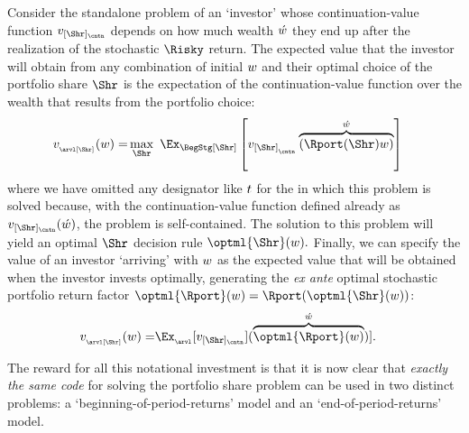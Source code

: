 Consider the standalone problem of an `investor' whose continuation-value function $\vFunc_{[\Shr]_\cntn}$ depends on how much wealth $\acute{w}$ they end up after the realization of the stochastic $\Risky$ return.  The expected value that the investor will obtain from any combination of initial $w$ and their optimal choice of the portfolio share $\Shr$ is the expectation of the continuation-value function over the wealth that results from the portfolio choice:
\begin{equation}\begin{gathered}\begin{aligned}
  \vFunc_{_\arvl[\Shr]}(\wlthBefr)  = & \max_{\Shr}~ \Ex_{\BegStg[\Shr]}\left[\vFunc_{[\Shr]_{_\cntn}}\overbrace{\left(\Rport(\Shr){\wlthBefr}\right)}^{\wlthAftr}\right] \label{eq:vMidStgShr}
    \end{aligned}\end{gathered}\end{equation}
where we have omitted any {\interval} designator like $t$ for the {\interval} in which this problem is solved because, with the continuation-value function defined already as $\vFunc_{[\Shr]_\cntn}(\wlthAftr)$, the problem is self-contained.  The solution to this problem will yield an optimal $\Shr$ decision rule $\optml{\Shr}(\wlthBefr).$  Finally, we can specify the value of an investor `arriving' with $w$ as the expected value that will be obtained when the investor invests optimally, generating the \textit{ex ante} optimal stochastic portfolio return factor $\optml{\Rport}(\wlthBefr)=\Rport(\optml{\Shr}(\wlthBefr))$:
\begin{equation}\begin{gathered}\begin{aligned}
      \vFunc_{_\arvl[\Shr]}(\wlthBefr)  = & \Ex_{_\arvl}[\vFunc_{[\Shr]_\cntn}](\overbrace{\optml{\Rport}(\wlthBefr)}^{\wlthAftr})].
\end{aligned}\end{gathered}\end{equation}

The reward for all this notational investment is that it is now clear that \emph{exactly the same code} for solving the portfolio share problem can be used in two distinct problems: a `beginning-of-period-returns' model and an `end-of-period-returns' model.

\hypertarget{beginning-returns}{}

